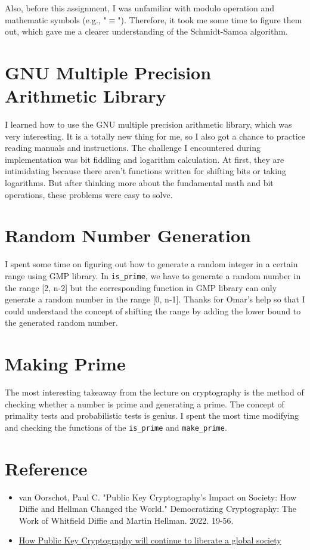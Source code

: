 \documentclass[12pt]{article}
\begin{document}
Also, before this assignment, I was unfamiliar with modulo operation and mathematic symbols (e.g., "$\equiv$"). Therefore, it took me some time to figure them out, which gave me a clearer understanding of the Schmidt-Samoa algorithm.
\section{GNU Multiple Precision Arithmetic Library}

I learned how to use the GNU multiple precision arithmetic library, which was very interesting. It is a totally new thing for me, so I also got a chance to practice reading manuals and instructions. The challenge I encountered during implementation was bit fiddling and logarithm calculation. At first, they are intimidating because there aren't functions written for shifting bits or taking logarithms. But after thinking more about the fundamental math and bit operations, these problems were easy to solve. 
\section{Random Number Generation}

I spent some time on figuring out how to generate a random integer in a certain range using GMP library. In \texttt{is\_prime}, we have to generate a random number in the range [2, n-2] but the corresponding function in GMP library can only generate a random number in the range [0, n-1]. Thanks for Omar's help so that I could understand the concept of shifting the range by adding the lower bound to the generated random number. 

\section{Making Prime}

The most interesting takeaway from the lecture on cryptography is the method of checking whether a number is prime and generating a prime. The concept of primality tests and probabilistic tests is genius. I spent the most time modifying and checking the functions of the \texttt{is\_prime} and \texttt{make\_prime}. 

\section{Reference}
\begin{itemize}
    \item van Oorschot, Paul C. "Public Key Cryptography’s Impact on Society: How Diffie and Hellman Changed the World." Democratizing Cryptography: The Work of Whitfield Diffie and Martin Hellman. 2022. 19-56.
    \item \href{https://stackoverflow.com/questions/11720656/modulo-operation-with-negative-numbers}{How Public Key Cryptography will continue to liberate a global society}
\end{itemize}
\end{document}

